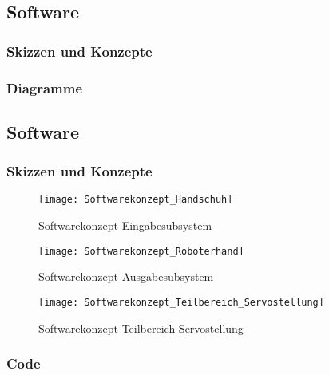 \documentclass[titlepage,12pt,twoside]{article}
\begin{document}
\newpage
\subsection{Software}
\label{chap:Fertigungsunterlagen_Software}
\subsubsection{Skizzen und Konzepte}


\subsubsection{Diagramme}
\subsection{Software}
\label{chap:Fertigungsunterlagen_Software}
\subsubsection{Skizzen und Konzepte}
\begin{figure}[H]
	\begin{center}
		\scalebox{0.6}
		{\texttt{[image: Softwarekonzept\_Handschuh]}}
		\caption{Softwarekonzept Eingabesubsystem}
		\label{fig:Softwarekonzept_Handschuh}		
	\end{center}
\end{figure}
\hfill \break
\begin{figure}[H]
	\begin{center}
		\scalebox{0.6}
		{\texttt{[image: Softwarekonzept\_Roboterhand]}}
		\caption{Softwarekonzept Ausgabesubsystem}
		\label{fig:Softwarekonzept_Roboterhand}		
	\end{center}
\end{figure}
\hfill \break
\begin{figure}[H]
	\begin{center}
		\scalebox{0.6}
		{\texttt{[image: Softwarekonzept\_Teilbereich\_Servostellung]}}
		\caption{Softwarekonzept Teilbereich Servostellung}
		\label{fig:Softwarekonzept_Teilbereich_Servostellung}		
	\end{center}
\end{figure}
\hfill \break

\subsubsection{Code}
\label{chap:Fertigungsunterlagen_Software_Code}
\end{document}
